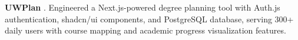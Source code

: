 \textbf{UWPlan} \href{https://github.com/pl3lee/uwplan}{\faGithub}. Engineered a Next.js-powered degree planning tool with Auth.js authentication, shadcn/ui components, and PostgreSQL database, serving 300+ daily users with course mapping and academic progress visualization features.